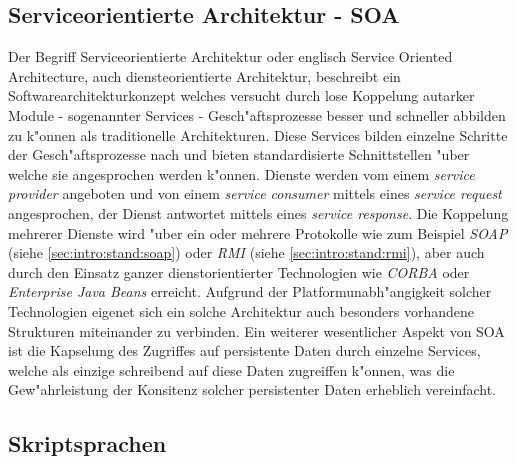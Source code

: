 \subsection{Serviceorientierte Architektur - SOA}
\label{sec:intro:stand:soa}
Der Begriff Serviceorientierte Architektur oder englisch Service Oriented Architecture, auch diensteorientierte Architektur,
beschreibt ein Softwarearchitekturkonzept welches versucht durch lose Koppelung autarker Module - sogenannter Services -
Gesch"aftsprozesse besser und schneller abbilden zu k"onnen als traditionelle Architekturen. Diese Services bilden
einzelne Schritte der Gesch"aftsprozesse nach und bieten standardisierte Schnittstellen "uber welche sie angesprochen
werden k"onnen. Dienste werden vom einem \emph{service provider} angeboten und von einem \emph{service consumer}
mittels eines \emph{service request} angesprochen, der Dienst antwortet mittels eines \emph{service response}.
Die Koppelung mehrerer Dienste wird "uber ein oder mehrere Protokolle wie zum Beispiel \emph{SOAP} (siehe \ref{sec:intro:stand:soap})
oder \emph{RMI} (siehe \ref{sec:intro:stand:rmi}), aber auch durch den Einsatz ganzer dienstorientierter Technologien
wie \emph{CORBA} oder \emph{Enterprise Java Beans} erreicht. 
Aufgrund der Platformunabh"angigkeit solcher Technologien eigenet sich ein solche Architektur auch besonders vorhandene
Strukturen miteinander zu verbinden.
Ein weiterer wesentlicher Aspekt von SOA ist die Kapselung des Zugriffes
auf persistente Daten durch einzelne Services, welche als einzige schreibend auf diese Daten zugreiffen k"onnen, was 
die Gew"ahrleistung der Konsitenz solcher persistenter Daten erheblich vereinfacht. 

\subsection{Skriptsprachen}
\label{sec:intro:stand:script}


